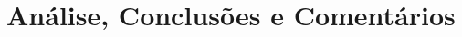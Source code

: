 \documentclass[a4paper,12pt]{article}  %
\begin{document}
\section{\sf Análise, Conclusões e Comentários}
\noindent\underline{\makebox[\textwidth][r]{~}} \\
\noindent\underline{\makebox[\textwidth][r]{~}} \\
\noindent\underline{\makebox[\textwidth][r]{~}} \\
\noindent\underline{\makebox[\textwidth][r]{~}} \\
\noindent\underline{\makebox[\textwidth][r]{~}} \\
\noindent\underline{\makebox[\textwidth][r]{~}} \\
\noindent\underline{\makebox[\textwidth][r]{~}} \\
\noindent\underline{\makebox[\textwidth][r]{~}} \\
\noindent\underline{\makebox[\textwidth][r]{~}} \\
\noindent\underline{\makebox[\textwidth][r]{~}} \\
\noindent\underline{\makebox[\textwidth][r]{~}} \\
\noindent\underline{\makebox[\textwidth][r]{~}} \\
\noindent\underline{\makebox[\textwidth][r]{~}} \\
\noindent\underline{\makebox[\textwidth][r]{~}} \\
\noindent\underline{\makebox[\textwidth][r]{~}} \\
\noindent\underline{\makebox[\textwidth][r]{~}} \\
\noindent\underline{\makebox[\textwidth][r]{~}} \\
\noindent\underline{\makebox[\textwidth][r]{~}} \\
\noindent\underline{\makebox[\textwidth][r]{~}} \\
\noindent\underline{\makebox[\textwidth][r]{~}} \\
\noindent\underline{\makebox[\textwidth][r]{~}} \\
\noindent\underline{\makebox[\textwidth][r]{~}} \\



\end{document}
